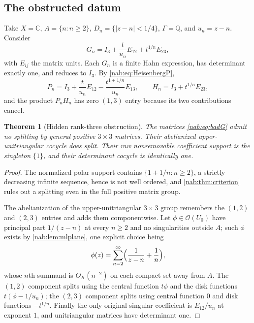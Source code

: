 \documentclass[11pt,letterpaper]{article}
\newtheorem{theorem}{Theorem}[section]
\theoremstyle{definition}
\theoremstyle{remark}
\newcommand{\C}{\mathbb C}
\newcommand{\Q}{\mathbb Q}
\newcommand{\OO}{\mathcal O}
\numberwithin{equation}{section}
\begin{document}
\subsection{The obstructed datum}

Take $X=\C$, $A=\{n:n\geq2\}$, $D_n=\{|z-n|<1/4\}$, $\Gamma=\Q$, and
$u_n=z-n$. Consider
\begin{equation}\label{nab:eq:badG}
 G_n=I_3+\frac{t}{u_n}E_{12}+t^{1/n}E_{23},
\end{equation}
with $E_{ij}$ the matrix units. Each $G_n$ is a finite Hahn expression, has
determinant exactly one, and reduces to $I_3$. By
\eqref{nab:eq:HeisenbergP},
\begin{equation}\label{nab:eq:badPH}
 P_n=I_3+\frac{t}{u_n}E_{12}-\frac{t^{1+1/n}}{u_n}E_{13},
 \qquad
 H_n=I_3+t^{1/n}E_{23},
\end{equation}
and the product $P_nH_n$ has zero $(1,3)$ entry because its two contributions
cancel.

\begin{theorem}[Hidden rank-three obstruction]\label{nab:thm:hidden}
The matrices \eqref{nab:eq:badG} admit no splitting by general positive
$3\times3$ matrices. Their abelianized upper-unitriangular cocycle does split.
Their raw nonremovable coefficient support is the singleton $\{1\}$, and their
determinant cocycle is identically one.
\end{theorem}

\begin{proof}
The normalized polar support contains $\{1+1/n:n\geq2\}$, a strictly
decreasing infinite sequence, hence is not well ordered, and
\cref{nab:thm:criterion} rules out a splitting even in the full positive
matrix group.

The abelianization of the upper-unitriangular $3\times3$ group remembers the
$(1,2)$ and $(2,3)$ entries and adds them componentwise. Let
$\phi\in\OO(U_0)$ have principal part $1/(z-n)$ at every $n\geq2$ and no
singularities outside $A$; such $\phi$ exists by \cref{nab:lem:mlplane}, one
explicit choice being
\begin{equation}\label{nab:eq:phi}
 \phi(z)=\sum_{n=2}^\infty\Bigl(\frac1{z-n}+\frac1n\Bigr),
\end{equation}
whose $n$th summand is $O_K(n^{-2})$ on each compact set away from $A$. The
$(1,2)$ component splits using the central function $t\phi$ and the disk
functions $t(\phi-1/u_n)$; the $(2,3)$ component splits using central function
$0$ and disk functions $-t^{1/n}$. Finally the only original singular
coefficient is $E_{12}/u_n$ at exponent $1$, and unitriangular matrices have
determinant one.
\end{proof}
\end{document}
